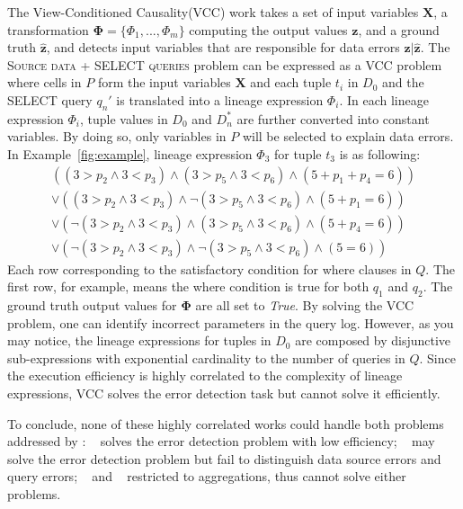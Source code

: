 The View-Conditioned Causality(VCC) work takes a set of input variables $\mathbf{X}$, a transformation $\mathbf{\Phi} =\{\Phi_1, ... , \Phi_m\}$ computing the
output values $\mathbf{z}$, and a ground truth $\hat{\mathbf{z}}$, and detects input variables that are responsible for data errors $\mathbf{z}|\hat{\mathbf{z}}$. 
The \textsc{Source data + SELECT queries} problem can be expressed as a VCC problem where cells in $P$ form the input variables $\mathbf{X}$ and each tuple $t_i$ in $D_0$ and the SELECT query $q_n'$ is translated into a lineage expression $\Phi_i$. In each lineage expression $\Phi_i$, tuple values in $D_0$ and $D_n^*$ are further converted into constant variables. By doing so, only variables in $P$ will be selected to explain data errors. In Example~\ref{fig:example}, lineage expression $\Phi_3$ for tuple $t_3$ is as following:
{\small
\begin{eqnarray*}
&((3 > p_2 \wedge 3 < p_3) \wedge (3 > p_5 \wedge 3 < p_6) \wedge (5 + p_1+p_4 = 6)) &\\
&\vee ((3 > p_2 \wedge 3 < p_3) \wedge \neg(3 > p_5 \wedge 3 < p_6) \wedge (5 + p_1= 6))& \\
&\vee (\neg(3 > p_2 \wedge 3 < p_3) \wedge (3 > p_5 \wedge 3 < p_6) \wedge (5 + p_4= 6))& \\
&\vee (\neg(3 > p_2 \wedge 3 < p_3) \wedge \neg(3 > p_5 \wedge 3 < p_6) \wedge (5 = 6))&
\end{eqnarray*}
}
Each row corresponding to the satisfactory condition for where clauses in $Q$. The first row, for example, means the where condition is true for both $q_1$ and $q_2$. The ground truth output values for $\mathbf{\Phi}$ are all set to \textit{True}. By solving the VCC problem, one can identify incorrect parameters in the query log. However, as you may notice, the lineage expressions for tuples in $D_0$ are composed by disjunctive sub-expressions with exponential cardinality to the number of queries in $Q$. Since the execution efficiency is highly correlated to the complexity of lineage expressions, VCC solves the error detection task but cannot solve it efficiently. 

To conclude, none of these highly correlated works could handle both problems addressed by \sys: ~\cite{meliou2011tracing} solves the error detection problem with low efficiency; ~\cite{chalamalla2014} may solve the error detection problem but fail to distinguish data source errors and query errors; ~\cite{Wu13} and ~\cite{roy2014formal} restricted to aggregations, thus cannot solve either problems.

